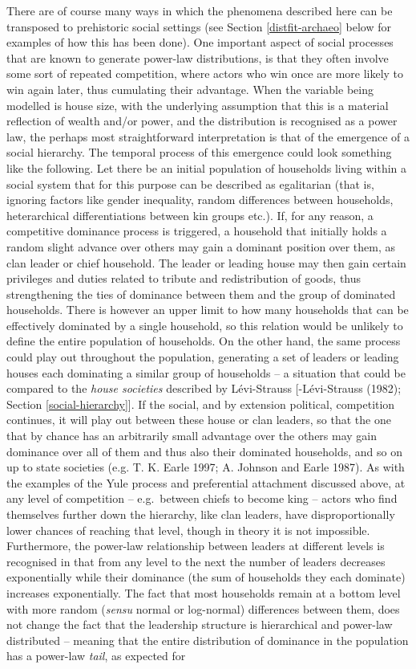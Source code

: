 \documentclass[
  12pt,
  a4paper, twoside]{book}
\begin{document}
There are of course many ways in which the phenomena described here can be transposed to prehistoric social settings (see Section \ref{distfit-archaeo} below for examples of how this has been done). One important aspect of social processes that are known to generate power-law distributions, is that they often involve some sort of repeated competition, where actors who win once are more likely to win again later, thus cumulating their advantage. When the variable being modelled is house size, with the underlying assumption that this is a material reflection of wealth and/or power, and the distribution is recognised as a power law, the perhaps most straightforward interpretation is that of the emergence of a social hierarchy. The temporal process of this emergence could look something like the following. Let there be an initial population of households living within a social system that for this purpose can be described as egalitarian (that is, ignoring factors like gender inequality, random differences between households, heterarchical differentiations between kin groups etc.). If, for any reason, a competitive dominance process is triggered, a household that initially holds a random slight advance over others may gain a dominant position over them, as clan leader or chief household. The leader or leading house may then gain certain privileges and duties related to tribute and redistribution of goods, thus strengthening the ties of dominance between them and the group of dominated households. There is however an upper limit to how many households that can be effectively dominated by a single household, so this relation would be unlikely to define the entire population of households. On the other hand, the same process could play out throughout the population, generating a set of leaders or leading houses each dominating a similar group of households -- a situation that could be compared to the \emph{house societies} described by Lévi-Strauss {[}-Lévi-Strauss (1982); Section \ref{social-hierarchy}{]}. If the social, and by extension political, competition continues, it will play out between these house or clan leaders, so that the one that by chance has an arbitrarily small advantage over the others may gain dominance over all of them and thus also their dominated households, and so on up to state societies (e.g. T. K. Earle 1997; A. Johnson and Earle 1987). As with the examples of the Yule process and preferential attachment discussed above, at any level of competition -- e.g.~between chiefs to become king -- actors who find themselves further down the hierarchy, like clan leaders, have disproportionally lower chances of reaching that level, though in theory it is not impossible. Furthermore, the power-law relationship between leaders at different levels is recognised in that from any level to the next the number of leaders decreases exponentially while their dominance (the sum of households they each dominate) increases exponentially. The fact that most households remain at a bottom level with more random (\emph{sensu} normal or log-normal) differences between them, does not change the fact that the leadership structure is hierarchical and power-law distributed -- meaning that the entire distribution of dominance in the population has a power-law \emph{tail}, as expected for 
\end{document}
